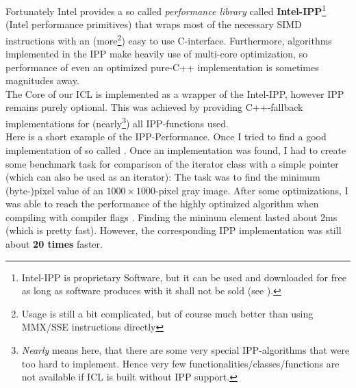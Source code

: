 \begin{enumerate}
Fortunately Intel provides a so called \emph{performance library} called \textbf{Intel-IPP}\footnote{Intel-IPP is proprietary Software, but it can be used and downloaded  for free as long as software produces with it shall not be sold (see ).} (Intel performance primitives) that wraps most of the necessary SIMD instructions with an (more\footnote{Usage is still a bit complicated, but of course much better than using MMX/SSE instructions directly}) easy to use C-interface. Furthermore, algorithms implemented in the IPP make heavily use of multi-core optimization, so performance of even an optimized pure-C++ implementation is sometimes magnitudes away.\\
The Core of our ICL is implemented as a wrapper of the Intel-IPP, however IPP remains purely optional. This was achieved by providing C++-fallback implementations for (nearly\footnote{\emph{Nearly} means here, that there are some very special IPP-algorithms that were too hard to implement. Hence very few functionalities/classes/functions are not available if ICL is built without IPP support.}) all IPP-functions used. \\
Here is a short example of the IPP-Performance. Once I tried to find a good implementation of so called . Once an implementation was found, I had to create some benchmark task for comparison of the iterator class with a simple pointer (which can also be used as an iterator): The task was to find the minimum (byte-)pixel value of an $1000\times{}1000$-pixel gray image. After some optimizations, I was able to reach the performance of the highly optimized  algorithm when compiling with compiler flags . Finding the mininum element lasted about $2$ms (which is pretty fast). However, the corresponding IPP implementation was still about \textbf{20 times} faster.
\end{enumerate}

